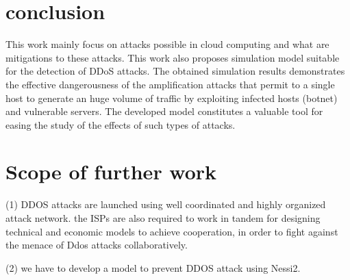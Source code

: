 \section{conclusion}
This work mainly focus on attacks possible in cloud computing and what are mitigations to these attacks.
This work also proposes simulation model suitable for the detection of DDoS attacks. The obtained simulation results demonstrates the effective dangerousness of the amplification attacks that permit to a single host to generate an huge volume of traffic by exploiting infected hosts (botnet) and vulnerable servers. The developed model constitutes a valuable tool for easing the study of the effects of such types of attacks.

\section{Scope of further work}
(1) DDOS attacks are launched using well coordinated and highly organized attack network. the ISPs are also required to work in tandem for designing technical and economic models to achieve cooperation, in order to fight against the menace of Ddos attacks collaboratively.

(2) we have to develop a model to prevent DDOS attack using Nessi2. 

